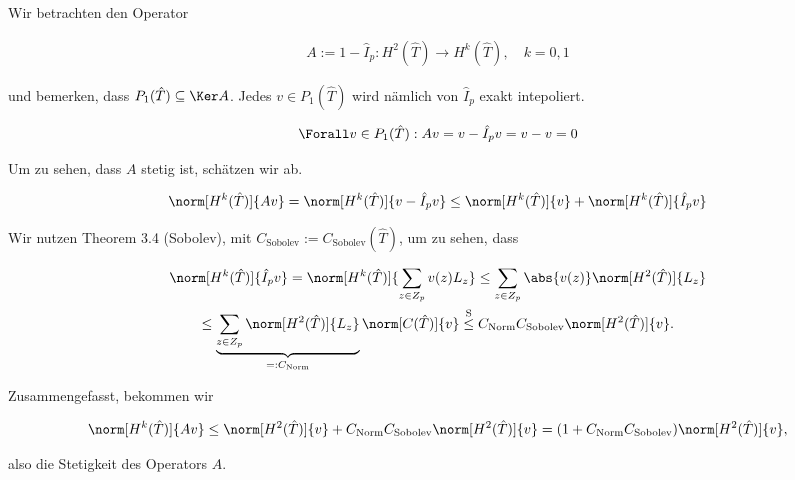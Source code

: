 \begin{solution}
\begin{enumerate}[label = \textbf{\alph*)}]
\begin{enumerate}[label = \arabic*.]
    Wir betrachten den Operator

    \begin{align*}
      A := 1 - \hat I_p:
      H^2(\hat T) \to H^k(\hat T),
      \quad
      k = 0, 1
    \end{align*}

    und bemerken, dass $P_1(\hat T) \subseteq \Ker A$.
    Jedes $v \in P_1(\hat T)$ wird nämlich von $\hat I_p$ exakt intepoliert.

    \begin{align*}
      \Forall v \in P_1(\hat T):
      A v = v - \hat I_p v = v - v = 0
    \end{align*}

    Um zu sehen, dass $A$ stetig ist, schätzen wir ab.

    \begin{align*}
      \norm[H^k(\hat T)]{A v}
      =
      \norm[H^k(\hat T)]{v - \hat I_p v}
      \leq
      \norm[H^k(\hat T)]{v}
      +
      \norm[H^k(\hat T)]{\hat I_p v}
    \end{align*}

    Wir nutzen Theorem 3.4 (Sobolev), mit $C_\mathrm{Sobolev} := C_\mathrm{Sobolev}(\hat T)$, um zu sehen, dass

    \begin{multline*}
      \norm[H^k(\hat T)]{\hat I_p v}
      =
      \norm[H^k(\hat T)]
      {
        \sum_{z \in Z_p}
        v(z) L_z
      }
      \leq
      \sum_{z \in Z_p}
      \abs{v(z)} \norm[H^2(\hat T)]{L_z} \\
      \leq
      \underbrace
      {
        \sum_{z \in Z_p}
        \norm[H^2(\hat T)]{L_z}
      }_{
        =: C_\mathrm{Norm}
      }
      \norm[C(\hat T)]{v}
      \stackrel
      {
        \mathrm{S}
      }{\leq}
      C_\mathrm{Norm}
      C_\mathrm{Sobolev}
      \norm[H^2(\hat T)]{v}.
    \end{multline*}

    Zusammengefasst, bekommen wir

    \begin{align*}
      \norm[H^k(\hat T)]{A v}
      \leq
      \norm[H^2(\hat T)]{v}
      +
      C_\mathrm{Norm}
      C_\mathrm{Sobolev}
      \norm[H^2(\hat T)]{v}
      =
      (1 + C_\mathrm{Norm} C_\mathrm{Sobolev})
      \norm[H^2(\hat T)]{v},
    \end{align*}

    also die Stetigkeit des Operators $A$.



\end{enumerate}
\end{enumerate}
\end{solution}

